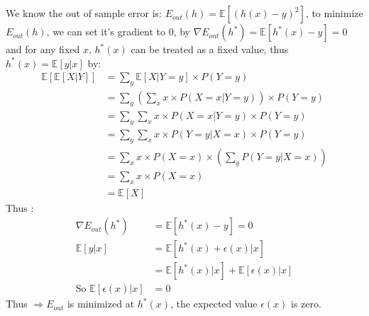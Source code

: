 \documentclass[12pt]{article}
\begin{document}
\newpage
{} \\\\
\indent We know the out of sample error is: $E_{out}(h) = \mathbb{E}[(h( {x})-y)^2]$, to minimize $E_{out}(h)$, we can set it's gradient to 0,  by $\displaystyle \nabla E_{out}(h^*) = \mathbb{E}[h^*( {x})-y] = 0$ and for any fixed $x$, $h^*(x)$ can be treated as a fixed value, thus $\displaystyle h^*(x) = \mathbb{E}[y|x]$ by:
\begin{align*}\displaystyle
		\mathbb{E}[\mathbb{E}[X\big|Y]] 
		&= \sum_{y}\mathbb{E}[X\big|Y=y]\times P(Y = y) \\
		&= \sum_{y}\left(\sum_{x}x\times P\left(X = x\big|Y = y\right)\right)\times P(Y = y) \\
		&= \sum_{y}\sum_{x}x\times P\left(X = x\big|Y = y\right)\times P(Y = y) \\
		&= \sum_{y}\sum_{x}x\times P\left(Y = y\big|X = x\right)\times P(Y = y) \\
		&= \sum_{x}x\times P(X = x)\times\left(\sum_{y}P\left(Y = y\big|X = x\right)\right) \\
		&= \sum_{x}x\times P(X = x) \\
		&= \mathbb{E}[X]
\end{align*}
Thus : 
\begin{align*}
		\displaystyle \nabla E_{out}(h^*) &= \mathbb{E}[h^*( {x})-y] = 0 \\
		\mathbb{E}[y|x] & = \mathbb{E}[h^*(x)+\epsilon(x)|x]\\
		&=\mathbb{E}[h^*(x)|x]+\mathbb{E}[\epsilon(x)|x]\\
		\mbox{So } \mathbb{E}[\epsilon(x)|x] &= 0
\end{align*}
\indent Thus $\Rightarrow E_{out}$ is minimized at $h^*(x)$, the expected value $\epsilon(x)$ is zero.\\\\
\end{document}
